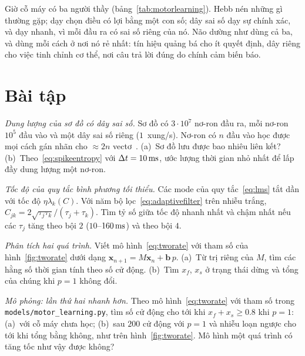 Giờ cỗ máy có ba người thầy (bảng~\ref{tab:motorlearning}). Hebb nén những gì thường gặp;  dạy chọn điều có lợi bằng một con số; dây sai số dạy sự chính xác, và dạy nhanh, vì mỗi đầu ra có sai số riêng của nó. Não dường như dùng cả ba, và dùng mỗi cách ở nơi nó rẻ nhất: tín hiệu quảng bá cho ít quyết định, dây riêng cho việc tinh chỉnh cơ thể, nơi câu trả lời đúng do chính cảm biến báo.

\section{Bài tập}

\begin{exercise}[\lvlA]
\label{ex:15:1}
\emph{Dung lượng của sơ đồ có dây sai số.} Sơ đồ có $3\cdot10^7$ nơ-ron đầu ra, mỗi nơ-ron $10^5$ đầu vào và một dây sai số riêng ($1$~xung/s). Nơ-ron có $n$ đầu vào học được mọi cách gán nhãn cho $\approx2n$ vectơ~\cite{Cover1965}. (a)~Sơ đồ lưu được bao nhiêu liên kết? (b)~Theo~\eqref{eq:spikeentropy} với $\Delta t=10\,\text{ms}$, ước lượng thời gian nhỏ nhất để lấp đầy dung lượng một nơ-ron.
\end{exercise}

\begin{exercise}[\lvlB]
\label{ex:15:2}
\emph{Tốc độ của quy tắc bình phương tối thiểu.} Các mode của quy tắc~\eqref{eq:lms} tắt dần với tốc độ $\eta\lambda_k(C)$. Với năm bộ lọc~\eqref{eq:adaptivefilter} trên nhiễu trắng, $C_{jk}=2\sqrt{\tau_j\tau_k}/(\tau_j+\tau_k)$. Tìm tỷ số giữa tốc độ nhanh nhất và chậm nhất nếu các $\tau_j$ tăng theo bội $2$ ($10$--$160\,\text{ms}$) và theo bội $4$.
\end{exercise}

\begin{exercise}[\lvlB]
\label{ex:15:3}
\emph{Phân tích hai quá trình.} Viết mô hình~\eqref{eq:tworate} với tham số của hình~\ref{fig:tworate} dưới dạng $\mathbf x_{n+1}=M\mathbf x_n+\mathbf b\,p$. (a)~Từ trị riêng của $M$, tìm các hằng số thời gian tính theo số cử động. (b)~Tìm $x_f$, $x_s$ ở trạng thái dừng và tổng của chúng khi $p=1$ không đổi.
\end{exercise}

\begin{exercise}[\lvlB]
\label{ex:15:4}
\emph{Mô phỏng: lần thứ hai nhanh hơn.} Theo mô hình~\eqref{eq:tworate} với tham số trong \texttt{models/\allowbreak motor\_learning.py}, tìm số cử động cho tới khi $x_f+x_s\ge0.8$ khi $p=1$: (a)~với cỗ máy chưa học; (b)~sau $200$ cử động với $p=1$ và nhiễu loạn ngược cho tới khi tổng bằng không, như trên hình~\ref{fig:tworate}. Mô hình một quá trình có tăng tốc như vậy được không?
\end{exercise}


